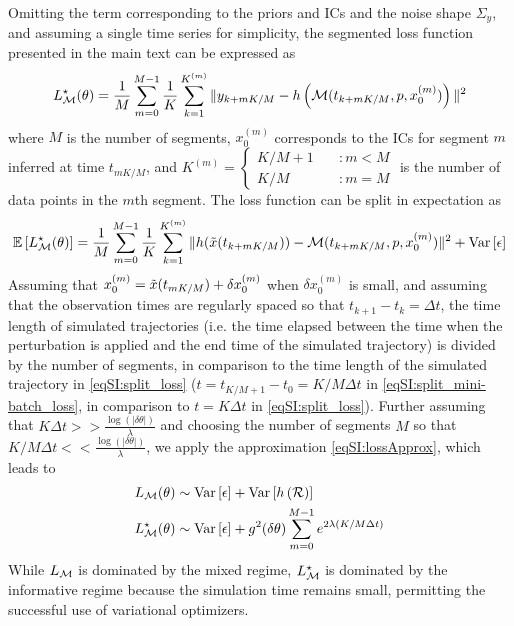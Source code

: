 Omitting the term corresponding to the priors and ICs and the noise shape $\Sigma_y$, and assuming a single time series for simplicity, 
the segmented loss function presented in the main text can be expressed as
\begin{equation}\label{eqSI:mini-batch_loss_fn}
        L_{\mathcal{M}}^\star(\theta) = \frac{1}{M} \sum_{m=0}^{M-1} \frac{1}{K} \sum_{k=1}^{K^{(m)}} \|y_{k + m K/M } - h\left(\mathcal{M}(t_{k + m K/M}, p, x_{0}^{(m)})\right)\|^2
\end{equation}
%
where $M$ is the number of segments, $x_0^{(m)}$ corresponds to the ICs for segment $m$ inferred at time $t_{m K/M}$, and
$K^{(m)} = \begin{cases} K / M + 1 &\quad \colon m < M \\ 
                    K / M &\quad \colon m = M
        \end{cases}$ is the number of data points in the $m$th segment.
%
The loss function can be split in expectation as
\begin{equation}\label{eqSI:split_mini-batch_loss}
		{\ensuremath{\mathbb{E}}} \left[L_{\mathcal{M}}^{\star}(\theta) \right] = \frac{1}{M} \sum_{m=0}^{M-1} \frac{1}{K} \sum_{k=1}^{K^{(m)}} \| h(\Tilde x(t_{k + m K/M})) - \mathcal{M}(t_{k + m K/M},p, x_0^{(m)})\|^2 + {\operatorname{Var}}\left[\epsilon\right]
\end{equation}
% 
Assuming that $x_0^{(m)} = \Tilde x (t_{m K/M}) + \delta x_0^{(m)} $ when $\delta x_0^{(m)}$ is small, and assuming that the observation times are regularly spaced so that $t_{k+1} - t_{k} = \Delta t$, the time length of simulated trajectories (i.e. the time elapsed between the time when the perturbation is applied and the end time of the simulated trajectory) is divided by the number of segments, in comparison to the time length of the simulated trajectory in \cref{eqSI:split_loss}  ($t = t_{K/M + 1} - t_{0} = K/M \Delta t$ in \cref{eqSI:split_mini-batch_loss}, in comparison to $t = K \Delta t$ in \cref{eqSI:split_loss}).
% 
Further assuming that $K \Delta t >> \frac{\log(|\delta \theta|)}{\lambda}$ and choosing the number of segments $M$ so that $K / M \Delta t << \frac{\log(|\delta \theta|)}{\lambda}$, we apply the approximation \cref{eqSI:lossApprox}, which leads to
\begin{equation}\label{eqSI:comparision_losses}
	\begin{aligned}
		&L_{\mathcal{M}}(\theta) \sim {\ensuremath{\operatorname{Var}}}\left[\epsilon\right] + 
		{\operatorname{Var}}\left[ h\left(\mathcal{R}\right) \right]\\
		&L_{\mathcal{M}}^{\star}(\theta) \sim {\ensuremath{\operatorname{Var}}}\left[\epsilon\right] + 
		g^2(\delta \theta) \sum_{m=0}^{M-1} e^{2\lambda (K / M \Delta t)}
	\end{aligned}
\end{equation}
While $L_{\mathcal{M}}$ is dominated by the mixed regime, $L_{\mathcal{M}}^\star$ is dominated by the informative regime because the simulation time remains small, permitting the successful use of variational optimizers.

